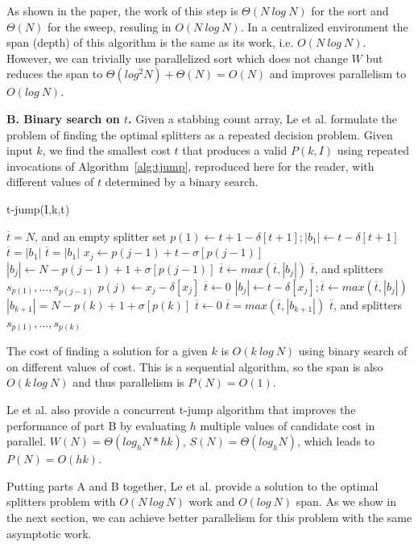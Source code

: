 As shown in the paper, the work of this step is $\Theta(N~log~N)$ for
the sort and $\Theta(N)$ for the sweep, resuling in $O(N~log~N)$.  In
a centralized environment the span (depth) of this algorithm is the
same as its work, i.e. $O(N~log~N)$.  However, we can trivially use
parallelized sort which does not change $W$ but reduces the span to
$\Theta(log^2 N) + \Theta(N) = O(N)$ and improves parallelism to
$O(log~N)$.

{\bf B. Binary search on $t$.}  Given a stabbing count array, Le et
al. formulate the problem of finding the optimal splitters as a
repeated decision problem.  Given input $k$, we find the smallest cost
$t$ that produces a valid $P(k,I)$ using repeated invocations of
Algorithm~\ref{alg:tjump}, reproduced here for the reader, with
different values of $t$ determined by a binary search.

\begin{algorithm}
\caption{t-jump(I,k,t)}
\begin{algorithmic}[1]
\Return $\overline{t} = N$, and an empty splitter set
\EndIf
\State $p(1) \gets t + 1 - \delta[t+1]; |b_1| \gets t - \delta[t+1]$
\Return $\overline{t} = |b_1|$
\EndIf
\State $\overline{t} = |b_1|$
\State $x_j \gets p(j-1) + t - \sigma[p(j-1)]$
\State $|b_j| \gets N - p(j-1) + 1 + \sigma[p(j-1)]$
\State $\overline{t} \gets max(\overline{t}, |b_j|)$
\State \Return $\overline{t}$, and splitters $s_{p(1)}, \ldots, s_{p(j-1)}$
\EndIf
\State $p(j) \gets x_j - \delta[x_j]$
\Return $\overline{t} \gets 0$
\EndIf
\State $|b_j| \gets t - \delta[x_j]; \overline{t} \gets max(\overline{t}, |b_j|)$
\EndFor
\State $|b_{k+1}| = N - p(k) + 1 + \sigma[p(k)]$
\Return $\overline{t} \gets 0$
\EndIf
\State $\overline{t} = max(\overline{t}, |b_{k+1}|)$
\State \Return $\overline{t}$, and splitters $s_{p(1)}, \ldots, s_{p(k)}$
\end{algorithmic}
\label{alg:tjump}
\end{algorithm}

The cost of finding a solution for a given $k$ is $O(k ~log ~N)$ using
binary search of on different values of cost.  This is a sequential
algorithm, so the span is also $O(k~log~N)$ and thus parallelism is
$P(N) = O(1)$.

Le et al. also provide a concurrent t-jump algorithm that improves the
performance of part B by evaluating $h$ multiple values of
candidate cost in parallel.  $W(N) = \Theta(log_hN*hk)$, $S(N) =
\Theta(log_hN)$, which leads to $P(N) = O(hk)$.

Putting parts A and B together, Le et al. provide a solution to the
optimal splitters problem with $O(N~log~N)$ work and $O(log~N)$ span.
As we show in the next section, we can achieve better parallelism for
this problem with the same asymptotic work.


